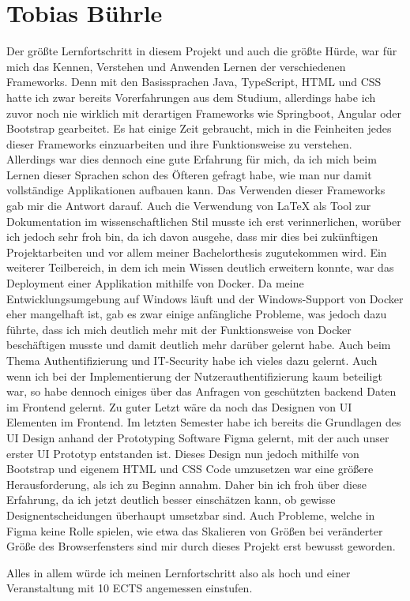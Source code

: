 \section{Tobias Bührle}
Der größte Lernfortschritt in diesem Projekt und auch die größte Hürde, war für mich das
Kennen, Verstehen und Anwenden Lernen der verschiedenen Frameworks. Denn mit den
Basissprachen Java, \gls{TypeScript}, HTML und CSS hatte ich zwar bereits Vorerfahrungen aus dem
Studium, allerdings habe ich zuvor noch nie wirklich mit derartigen Frameworks wie
Springboot, Angular oder Bootstrap gearbeitet. Es hat einige Zeit gebraucht, mich in die
Feinheiten jedes dieser Frameworks einzuarbeiten und ihre Funktionsweise zu verstehen.
Allerdings war dies dennoch eine gute Erfahrung für mich, da ich mich beim
Lernen dieser Sprachen schon des Öfteren gefragt habe, wie man nur damit vollständige
Applikationen aufbauen kann. Das Verwenden dieser Frameworks gab mir die Antwort darauf.
Auch die Verwendung von LaTeX als Tool zur Dokumentation im wissenschaftlichen Stil
musste ich erst verinnerlichen, worüber ich jedoch sehr froh bin, da ich davon ausgehe,
dass mir dies bei zukünftigen Projektarbeiten und vor allem meiner Bachelorthesis 
zugutekommen wird. Ein weiterer Teilbereich, in dem ich mein Wissen deutlich erweitern 
konnte, war das Deployment einer Applikation mithilfe von Docker. Da meine 
Entwicklungsumgebung
auf Windows läuft und der Windows-Support von Docker eher mangelhaft ist, gab es zwar
einige anfängliche Probleme, was jedoch dazu führte, dass ich mich deutlich mehr
mit der Funktionsweise von Docker beschäftigen musste und damit deutlich mehr darüber
gelernt habe. Auch beim Thema Authentifizierung und IT-Security habe ich vieles dazu
gelernt. Auch wenn ich bei der Implementierung der Nutzerauthentifizierung kaum beteiligt
war, so habe dennoch einiges über das Anfragen von geschützten backend Daten im
Frontend gelernt. Zu guter Letzt wäre da noch das Designen von \ac{UI} Elementen im
Frontend. Im letzten Semester habe ich bereits die Grundlagen des \ac{UI} Design anhand der
Prototyping Software Figma gelernt, mit der auch unser erster \ac{UI} Prototyp entstanden
ist. Dieses Design nun jedoch mithilfe von Bootstrap und eigenem HTML und CSS Code
umzusetzen war eine größere Herausforderung, als ich zu Beginn annahm. Daher bin ich froh
über diese Erfahrung, da ich jetzt deutlich besser einschätzen kann, ob gewisse
Designentscheidungen überhaupt umsetzbar sind. Auch Probleme, welche in Figma keine Rolle
spielen, wie etwa das Skalieren von Größen bei veränderter Größe des Browserfensters sind
mir durch dieses Projekt erst bewusst geworden.

Alles in allem würde ich meinen Lernfortschritt also als hoch und einer Veranstaltung mit
10 \ac{ECTS} angemessen einstufen.